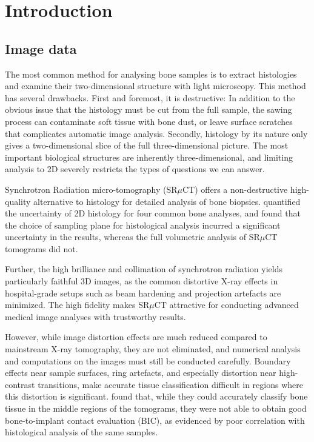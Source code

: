 \section{Introduction}
\label{sec:intro}


\subsection{Image data}

The most common method for analysing bone samples is to extract histologies and examine their
two-dimensional structure with light microscopy. This method has several drawbacks. First and
foremost, it is destructive: In addition to the obvious issue that the histology must be cut
from the full sample, the sawing process can contaminate soft tissue with bone dust, or leave
surface scratches that complicates automatic image analysis. Secondly, histology by its nature
only gives a two-dimensional slice of the full three-dimensional picture. The most important
biological structures are inherently three-dimensional, and limiting analysis to 2D severely
restricts the types of questions we can answer.

Synchrotron Radiation micro-tomography (SR$\mu$CT) offers a non-destructive high-quality
alternative to histology for detailed analysis of bone biopsies. \cite{torsten2018}
quantified the uncertainty of 2D histology for four common bone analyses, and found that the
choice of sampling plane for histological analysis incurred a significant uncertainty in the
results, whereas the full volumetric analysis of SR$\mu$CT tomograms did not.

Further, the high brilliance and collimation of synchrotron radiation yields particularly
faithful 3D images, as the common distortive X-ray effects in hospital-grade setups such
as beam hardening and projection artefacts are minimized. The high fidelity makes SR$\mu$CT
attractive for conducting advanced medical image analyses with trustworthy results.

However, while image distortion effects are much reduced compared to mainstream X-ray tomography,
they are not eliminated, and numerical analysis and computations on the images must still be
conducted carefully. Boundary effects near sample surfaces, ring artefacts, and especially
distortion near high-contrast transitions, make accurate tissue classification difficult in
regions where this distortion is significant. \cite{sporring} found that, while
they could accurately classify bone tissue in the middle regions of the tomograms, they were
not able to obtain good bone-to-implant contact evaluation (BIC), as evidenced by poor correlation
with histological analysis of the same samples.

